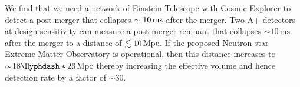 \documentclass[../Thesis.tex]{subfiles}
\begin{document}
    We find that we need a network of Einstein Telescope with Cosmic Explorer to detect a post-merger that collapses $\sim10\,\mathrm{ms}$ after the merger.
    Two A+ detectors at design sensitivity can measure a post-merger remnant that collapses $\sim\!10\,\mathrm{ms}$  after the merger to a distance of $\lesssim 10\,\mathrm{Mpc}$.
    If the proposed Neutron star Extreme Matter Observatory is operational, then this distance increases to $\sim\!18\Hyphdash*26\,\Mpc$ thereby increasing the effective volume and hence detection rate by a factor of $\sim 30$.
    
    


   

  
\end{document}
